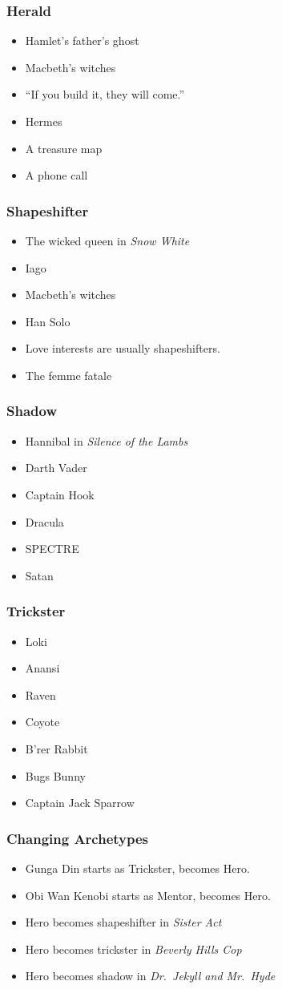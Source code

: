 \documentclass{beamer}
\newcommand{\bi}{\begin{itemize}}
\newcommand{\ei}{\end{itemize}}
\begin{document}
\begin{frame}\frametitle{Herald}
\bi
\item Hamlet's father's ghost
\item Macbeth's witches
\item ``If you build it, they will come.''
\item Hermes
\item A treasure map
\item A phone call
\ei

\end{frame}
\begin{frame}\frametitle{Shapeshifter}
\bi
\item The wicked queen in {\em Snow White}
\item Iago
\item Macbeth's witches
\item Han Solo
\item Love interests are usually shapeshifters.
\item The femme fatale
\ei

\end{frame}
\begin{frame}\frametitle{Shadow}
\bi
\item Hannibal in {\em Silence of the Lambs}
\item Darth Vader
\item Captain Hook
\item Dracula
\item SPECTRE
\item Satan
\ei

\end{frame}
\begin{frame}\frametitle{Trickster}
\bi
\item Loki
\item Anansi
\item Raven
\item Coyote
\item B'rer Rabbit
\item Bugs Bunny
\item Captain Jack Sparrow
\ei

\end{frame}
\begin{frame}\frametitle{Changing Archetypes}
\bi
\item Gunga Din starts as Trickster, becomes Hero.
\item Obi Wan Kenobi starts as Mentor, becomes Hero.
\item Hero becomes shapeshifter in {\em Sister Act}
\item Hero becomes trickster in {\em Beverly Hills Cop}
\item Hero becomes shadow in {\em Dr.~Jekyll and Mr.~Hyde}
\ei

\end{frame}
\end{document}
